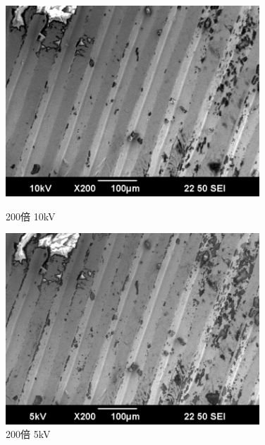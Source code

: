 \documentclass[a4paper,11pt]{jsarticle}
\begin{document}
\begin{figure}[H]
  \begin{minipage}{0.5\hsize}
    \begin{center}
      \includegraphics[width=0.85\textwidth]{figs/0523/record/200_10kV.pdf}
    \end{center}
    \caption{200倍 10kV}
  \end{minipage}
  \begin{minipage}{0.5\hsize}
    \begin{center}
      \includegraphics[width=0.85\textwidth]{figs/0523/record/200_5kV.pdf}
    \end{center}
    \caption{200倍 5kV}
  \end{minipage}
\end{figure}
\end{document}
